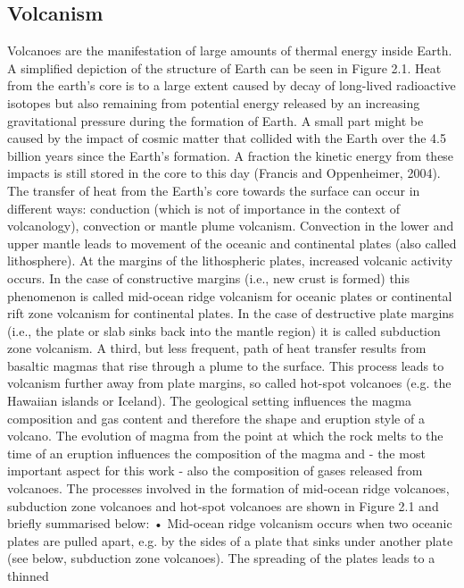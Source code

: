 \documentclass  [
  paper    = a4,
  BCOR     = 10mm,
  twoside,
  fontsize = 12pt,
  fleqn,
  toc      = bibnumbered,
  toc      = listofnumbered,
  numbers  = noendperiod,
  headings = normal,
  listof   = leveldown,
  version  = 3.03
]                                       {scrreprt}
\begin{document}
	\subsection{Volcanism}

	Volcanoes are the manifestation of large amounts of thermal energy inside Earth.
	A simplified depiction of the structure of Earth can be seen in Figure 2.1. Heat
	from the earth’s core is to a large extent caused by decay of long-lived radioactive
	isotopes but also remaining from potential energy released by an increasing
	gravitational pressure during the formation of Earth. A small part might be
	caused by the impact of cosmic matter that collided with the Earth over the
	4.5 billion years since the Earth’s formation. A fraction the kinetic energy from
	these impacts is still stored in the core to this day (Francis and Oppenheimer,
	2004).
	The transfer of heat from the Earth’s core towards the surface can occur
	in different ways: conduction (which is not of importance in the context of
	volcanology), convection or mantle plume volcanism. Convection in the lower
	and upper mantle leads to movement of the oceanic and continental plates (also
	called lithosphere). At the margins of the lithospheric plates, increased volcanic
	activity occurs. In the case of constructive margins (i.e., new crust is formed) this
	phenomenon is called mid-ocean ridge volcanism for oceanic plates or continental
	rift zone volcanism for continental plates. In the case of destructive plate margins
	(i.e., the plate or slab sinks back into the mantle region) it is called subduction
	zone volcanism. A third, but less frequent, path of heat transfer results from
	basaltic magmas that rise through a plume to the surface. This process leads
	to volcanism further away from plate margins, so called hot-spot volcanoes (e.g.
	the Hawaiian islands or Iceland).
	The geological setting influences the magma composition and gas content and
	therefore the shape and eruption style of a volcano. The evolution of magma
	from the point at which the rock melts to the time of an eruption influences the
	composition of the magma and - the most important aspect for this work - also
	the composition of gases released from volcanoes.
	The processes involved in the formation of mid-ocean ridge volcanoes, subduction
	zone volcanoes and hot-spot volcanoes are shown in Figure 2.1 and briefly
	summarised below:
	• Mid-ocean ridge volcanism occurs when two oceanic plates are pulled apart,
	e.g. by the sides of a plate that sinks under another plate (see below,
	subduction zone volcanoes). The spreading of the plates leads to a thinned
\end{document}
